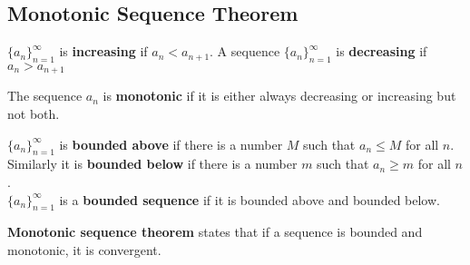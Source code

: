 \documentclass[english, 12pt]{article}
\begin{document}
\subsection{Monotonic Sequence Theorem}
\begin{defn}
$\{a_{n}\}_{n=1}^\infty$ is \textbf{increasing} if $a_{n} < a_{n+1}$. A sequence $\{a_{n}\}_{n=1}^\infty$ is \textbf{decreasing} if $a_{n} > a_{n+1}$
\end{defn}
\begin{defn}
The sequence $a_{n}$ is \textbf{monotonic} if it is either always decreasing or increasing but not both.
\end{defn}
\begin{defn}
$\{a_{n}\}_{n=1}^\infty$ is \textbf{bounded above} if there is a number $M$ such that $a_{n} \leq M$ for all $n$. Similarly it is \textbf{bounded below} if there is a number $m$ such that $a_{n} \geq m$ for all $n$.\\
$\{a_{n}\}_{n=1}^\infty$ is a \textbf{bounded sequence} if it is bounded above and bounded below.
\end{defn}
\begin{thrm}[MST]
\textbf{Monotonic sequence theorem} states that if a sequence is bounded and monotonic, it is convergent.
\end{thrm}
\end{document}
